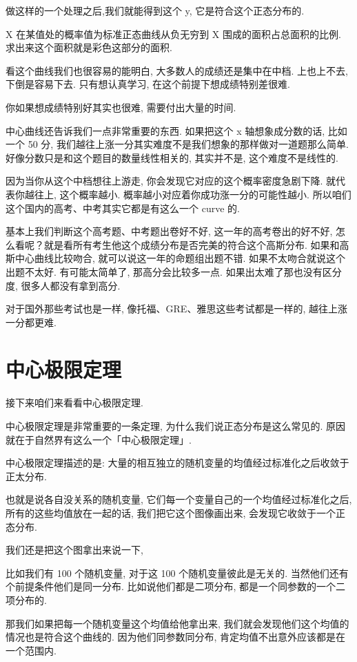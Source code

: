 做这样的一个处理之后,我们就能得到这个 y, 它是符合这个正态分布的. 

X 在某值处的概率值为标准正态曲线从负无穷到 X 围成的面积占总面积的比例. 求出来这个面积就是彩色这部分的面积. 

看这个曲线我们也很容易的能明白, 大多数人的成绩还是集中在中档. 上也上不去, 下倒是容易下去. 只有想认真学习, 在这个前提下想成绩特别差很难. 

你如果想成绩特别好其实也很难, 需要付出大量的时间. 

中心曲线还告诉我们一点非常重要的东西. 如果把这个 x 轴想象成分数的话, 比如一个 50 分, 我们越往上涨一分其实难度不是我们想象的那样做对一道题那么简单. 好像分数只是和这个题目的数量线性相关的, 其实并不是, 这个难度不是线性的. 

因为当你从这个中档想往上游走, 你会发现它对应的这个概率密度急剧下降. 就代表你越往上, 这个概率越小. 概率越小对应着你成功涨一分的可能性越小. 所以咱们这个国内的高考、中考其实它都是有这么一个 curve 的. 

基本上我们判断这个高考题、中考题出卷好不好, 这一年的高考卷出的好不好, 怎么看呢？就是看所有考生他这个成绩分布是否完美的符合这个高斯分布. 如果和高斯中心曲线比较吻合, 就可以说这一年的命题组出题不错. 如果不太吻合就说这个出题不太好. 有可能太简单了, 那高分会比较多一点. 如果出太难了那也没有区分度, 很多人都没有拿到高分. 

对于国外那些考试也是一样, 像托福、GRE、雅思这些考试都是一样的, 越往上涨一分都更难. 

\section{中心极限定理}

接下来咱们来看看中心极限定理. 

中心极限定理是非常重要的一条定理, 为什么我们说正态分布是这么常见的. 原因就在于自然界有这么一个「中心极限定理」. 

中心极限定理描述的是: 大量的相互独立的随机变量的均值经过标准化之后收敛于正太分布. 

也就是说各自没关系的随机变量, 它们每一个变量自己的一个均值经过标准化之后, 所有的这些均值放在一起的话, 我们把它这个图像画出来, 会发现它收敛于一个正态分布. 

我们还是把这个图拿出来说一下, 

比如我们有 100 个随机变量, 对于这 100 个随机变量彼此是无关的. 当然他们还有个前提条件他们是同一分布. 比如说他们都是二项分布, 都是一个同参数的一个二项分布的. 

那我们如果把每一个随机变量这个均值给他拿出来, 我们就会发现他们这个均值的情况也是符合这个曲线的. 因为他们同参数同分布, 肯定均值不出意外应该都是在一个范围内. 

